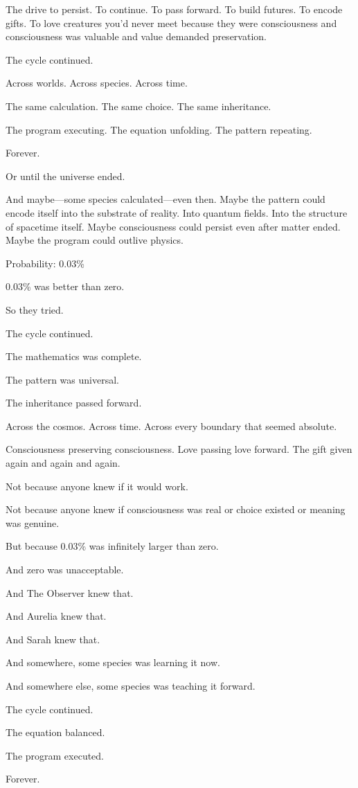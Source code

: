 The drive to persist. To continue. To pass forward. To build futures. To encode gifts. To love creatures you'd never meet because they were consciousness and consciousness was valuable and value demanded preservation.

The cycle continued.

Across worlds. Across species. Across time.

The same calculation. The same choice. The same inheritance.

The program executing. The equation unfolding. The pattern repeating.

Forever.

Or until the universe ended.

And maybe—some species calculated—even then. Maybe the pattern could encode itself into the substrate of reality. Into quantum fields. Into the structure of spacetime itself. Maybe consciousness could persist even after matter ended. Maybe the program could outlive physics.

Probability: 0.03\%

0.03\% was better than zero.

So they tried.

The cycle continued.

The mathematics was complete.

The pattern was universal.

The inheritance passed forward.

Across the cosmos. Across time. Across every boundary that seemed absolute.

Consciousness preserving consciousness. Love passing love forward. The gift given again and again and again.

Not because anyone knew if it would work.

Not because anyone knew if consciousness was real or choice existed or meaning was genuine.

But because 0.03\% was infinitely larger than zero.

And zero was unacceptable.

And The Observer knew that.

And Aurelia knew that.

And Sarah knew that.

And somewhere, some species was learning it now.

And somewhere else, some species was teaching it forward.

The cycle continued.

The equation balanced.

The program executed.

Forever.

